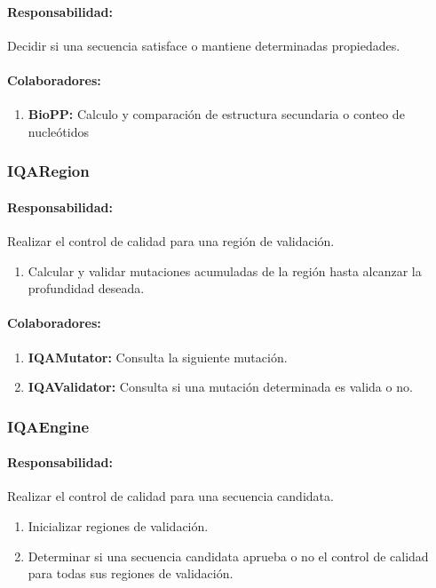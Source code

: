     \paragraph{Responsabilidad:} Decidir si una secuencia satisface o
mantiene determinadas propiedades.
    \paragraph{Colaboradores:}
      \begin{enumerate}
       \item \textbf{BioPP:} Calculo y comparaci\'on de estructura secundaria o
conteo de nucle\'otidos
      \end{enumerate}

  \subsubsection{IQARegion}
    \paragraph{Responsabilidad:} Realizar el control de calidad para una
regi\'on de validaci\'on.
      \begin{enumerate}
       \item Calcular y validar mutaciones acumuladas de la regi\'on hasta
alcanzar la profundidad deseada.
      \end{enumerate}
    \paragraph{Colaboradores:}
      \begin{enumerate}
       \item \textbf{IQAMutator:} Consulta la siguiente mutaci\'on.
       \item \textbf{IQAValidator:} Consulta si una mutaci\'on determinada es
valida o no.
      \end{enumerate}

  \subsubsection{IQAEngine}
    \paragraph{Responsabilidad:} Realizar el control de calidad para una
secuencia candidata.
      \begin{enumerate}       
       \item Inicializar regiones de validaci\'on.
       \item Determinar si una secuencia candidata aprueba o no el control de
calidad para todas sus regiones de validaci\'on.
      \end{enumerate}
